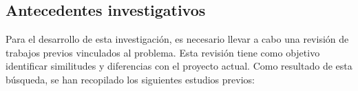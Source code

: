 \subsection{Antecedentes investigativos}


% 



Para el desarrollo de esta investigación, es necesario llevar a cabo una revisión de trabajos previos vinculados al problema. Esta revisión tiene como objetivo identificar similitudes y diferencias con el proyecto actual. Como resultado de esta búsqueda, se han recopilado los siguientes estudios previos:


